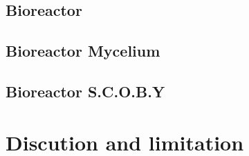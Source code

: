 \subsection{Bioreactor}
\subsection{Bioreactor Mycelium}
\subsection{Bioreactor S.C.O.B.Y}


\section{Discution and limitation}